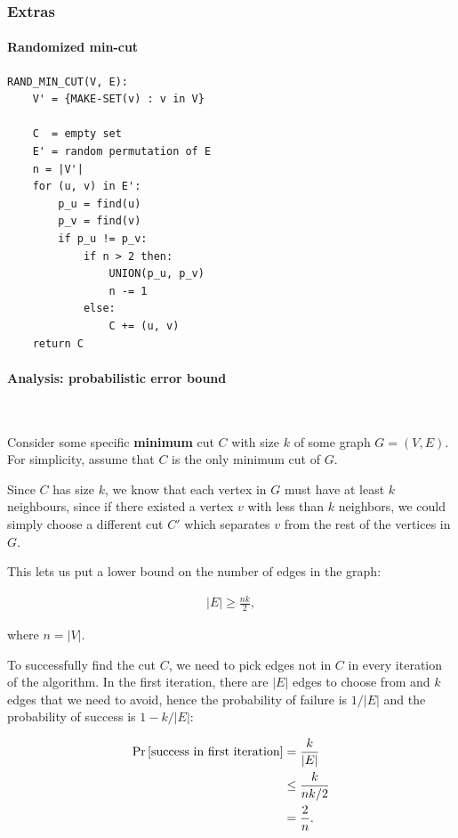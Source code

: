 \subsubsection{Extras}

\paragraph{Randomized min-cut}

\begin{verbatim}
RAND_MIN_CUT(V, E):
    V' = {MAKE-SET(v) : v in V}

    C  = empty set
    E' = random permutation of E
    n = |V'|
    for (u, v) in E':
        p_u = find(u)
        p_v = find(v)
        if p_u != p_v:
            if n > 2 then:
                UNION(p_u, p_v)
                n -= 1
            else:
                C += (u, v)
    return C
\end{verbatim}

\paragraph{Analysis: probabilistic error bound}~\smallskip

Consider some specific \textbf{minimum} cut $C$ with size $k$ of some graph $G =
(V, E)$. For simplicity, assume that $C$ is the only minimum cut of $G$.

Since $C$ has size $k$, we know that each vertex in $G$ must have at least $k$
neighbours, since if there existed a vertex $v$ with less than $k$ neighbors, we
could simply choose a different cut $C'$ which separates $v$ from the rest of
the vertices in $G$.

This lets us put a lower bound on the number of edges in the graph:

\begin{textred}
  \begin{align}
    |E| \geq \frac{nk}{2},
  \end{align}
\end{textred}

where $n = |V|$.

To successfully find the cut $C$, we need to pick edges not in $C$ in every
iteration of the algorithm. In the first iteration, there are $|E|$ edges to
choose from and $k$ edges that we need to avoid, hence the probability of
failure is $1/|E|$ and the probability of success is $1 - k/|E|$:

\begin{textred}
  \begin{align}
    \underset{}{\text{Pr}}\left[\text{success in first iteration}\right] &= \frac{k}{|E|}\\
                                             &\leq \frac{k}{nk / 2}\\
                                             &= \frac{2}{n}.
  \end{align}
\end{textred}

